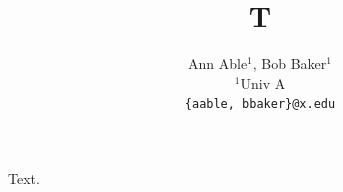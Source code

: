 \documentclass{article}
\title{T}
\author{Ann Able$^1$, Bob Baker$^1$ \\ $^1$Univ A \\ \texttt{\{\color{black}aable, bbaker\}@x.edu}}
\begin{document}
\maketitle
Text.
\end{document}
